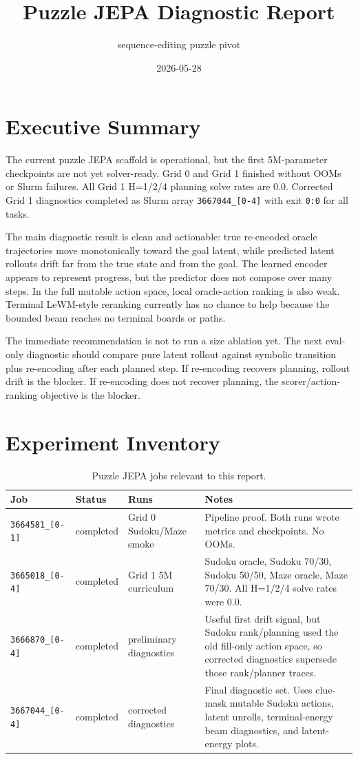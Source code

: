 \documentclass[11pt]{article}
\title{Puzzle JEPA Diagnostic Report}
\author{sequence-editing puzzle pivot}
\date{2026-05-28}
\begin{document}
\maketitle

\section{Executive Summary}

The current puzzle JEPA scaffold is operational, but the first 5M-parameter
checkpoints are not yet solver-ready. Grid 0 and Grid 1 finished without OOMs or
Slurm failures. All Grid 1 H=1/2/4 planning solve rates are 0.0. Corrected Grid
1 diagnostics completed as Slurm array \texttt{3667044\_[0-4]} with exit
\texttt{0:0} for all tasks.

The main diagnostic result is clean and actionable: true re-encoded oracle
trajectories move monotonically toward the goal latent, while predicted latent
rollouts drift far from the true state and from the goal. The learned encoder
appears to represent progress, but the predictor does not compose over many
steps. In the full mutable action space, local oracle-action ranking is also
weak. Terminal LeWM-style reranking currently has no chance to help because the
bounded beam reaches no terminal boards or paths.

The immediate recommendation is not to run a size ablation yet. The next
eval-only diagnostic should compare pure latent rollout against symbolic
transition plus re-encoding after each planned step. If re-encoding recovers
planning, rollout drift is the blocker. If re-encoding does not recover
planning, the scorer/action-ranking objective is the blocker.

\section{Experiment Inventory}

\begin{table}[H]
\centering
\small
\begin{tabularx}{\textwidth}{l l l X}
\toprule
Job & Status & Runs & Notes \\
\midrule
\texttt{3664581\_[0-1]} & completed & Grid 0 Sudoku/Maze smoke &
Pipeline proof. Both runs wrote metrics and checkpoints. No OOMs. \\
\texttt{3665018\_[0-4]} & completed & Grid 1 5M curriculum &
Sudoku oracle, Sudoku 70/30, Sudoku 50/50, Maze oracle, Maze 70/30.
All H=1/2/4 solve rates were 0.0. \\
\texttt{3666870\_[0-4]} & completed & preliminary diagnostics &
Useful first drift signal, but Sudoku rank/planning used the old fill-only
action space, so corrected diagnostics supersede those rank/planner traces. \\
\texttt{3667044\_[0-4]} & completed & corrected diagnostics &
Final diagnostic set. Uses clue-mask mutable Sudoku actions, latent unrolls,
terminal-energy beam diagnostics, and latent-energy plots. \\
\bottomrule
\end{tabularx}
\caption{Puzzle JEPA jobs relevant to this report.}
\end{table}
\end{document}
